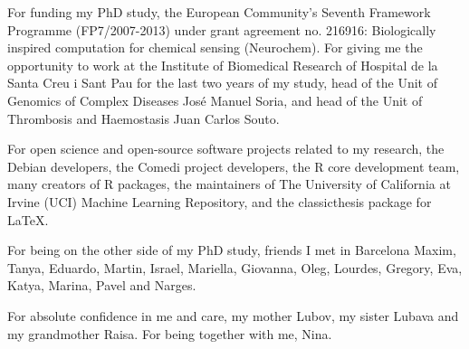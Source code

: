 For funding my PhD study,
the European Community's Seventh Framework Programme (FP7/2007-2013)
under grant agreement no. 216916: 
Biologically inspired computation for chemical sensing (Neurochem).
For giving me the opportunity to work at 
the Institute of Biomedical Research of Hospital de la Santa Creu i Sant Pau
for the last two years of my study,
head of the Unit of Genomics of Complex Diseases Jos\'{e} Manuel Soria,
and head of the Unit of Thrombosis and Haemostasis Juan Carlos Souto.

For open science and open-source software projects related to my research, 
the Debian developers, the Comedi project developers,
the R core development team, many creators of R packages, 
the maintainers of The University of California at Irvine (UCI) 
Machine Learning Repository, and
the classicthesis package for \LaTeX.

For being on the other side of my PhD study, friends I met in Barcelona
Maxim, Tanya, Eduardo, Martin, Israel, Mariella, Giovanna, 
Oleg, Lourdes, Gregory, Eva, Katya, Marina, Pavel and Narges.

For absolute confidence in me and care, my mother Lubov, my sister Lubava and my grandmother Raisa.
For being together with me, Nina.

